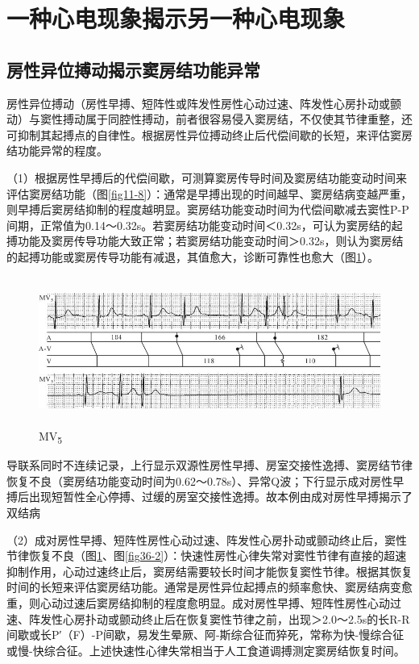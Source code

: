 \protect\hypertarget{text00043.htmlux5cux23subid465}{}{}

\section{一种心电现象揭示另一种心电现象}

\protect\hypertarget{text00043.htmlux5cux23subid466}{}{}

\subsection{房性异位搏动揭示窦房结功能异常}

房性异位搏动（房性早搏、短阵性或阵发性房性心动过速、阵发性心房扑动或颤动）与窦性搏动属于同腔性搏动，前者很容易侵入窦房结，不仅使其节律重整，还可抑制其起搏点的自律性。根据房性异位搏动终止后代偿间歇的长短，来评估窦房结功能异常的程度。

（1）根据房性早搏后的代偿间歇，可测算窦房传导时间及窦房结功能变动时间来评估窦房结功能（图\ref{fig11-8}）：通常是早搏出现的时间越早、窦房结病变越严重，则早搏后窦房结抑制的程度越明显。窦房结功能变动时间为代偿间歇减去窦性P-P间期，正常值为0.14～0.32s。若窦房结功能变动时间＜0.32s，可认为窦房结的起搏功能及窦房传导功能大致正常；若窦房结功能变动时间＞0.32s，则认为窦房结的起搏功能或窦房传导功能有减退，其值愈大，诊断可靠性也愈大（图\ref{fig36-1}）。

\begin{figure}[!htbp]
 \centering
 \includegraphics[width=5.71875in,height=1.91667in]{./images/Image00573.jpg}
 \captionsetup{justification=centering}
 \caption{MV\textsubscript{5}}
 \label{fig36-1}
  \end{figure} 
导联系同时不连续记录，上行显示双源性房性早搏、房室交接性逸搏、窦房结节律恢复不良（窦房结功能变动时间为0.62～0.78s）、异常Q波；下行显示成对房性早搏后出现短暂性全心停搏、过缓的房室交接性逸搏。故本例由成对房性早搏揭示了双结病

（2）成对房性早搏、短阵性房性心动过速、阵发性心房扑动或颤动终止后，窦性节律恢复不良（图\ref{fig36-1}、图\ref{fig36-2}）：快速性房性心律失常对窦性节律有直接的超速抑制作用，心动过速终止后，窦房结需要较长时间才能恢复窦性节律。根据其恢复时间的长短来评估窦房结功能。通常是房性异位起搏点的频率愈快、窦房结病变愈重，则心动过速后窦房结抑制的程度愈明显。成对房性早搏、短阵性房性心动过速、阵发性心房扑动或颤动终止后在恢复窦性节律之前，出现＞2.0～2.5s的长R-R间歇或长P′（F）-P间歇，易发生晕厥、阿-斯综合征而猝死，常称为快-慢综合征或慢-快综合征。上述快速性心律失常相当于人工食道调搏测定窦房结恢复时间。

